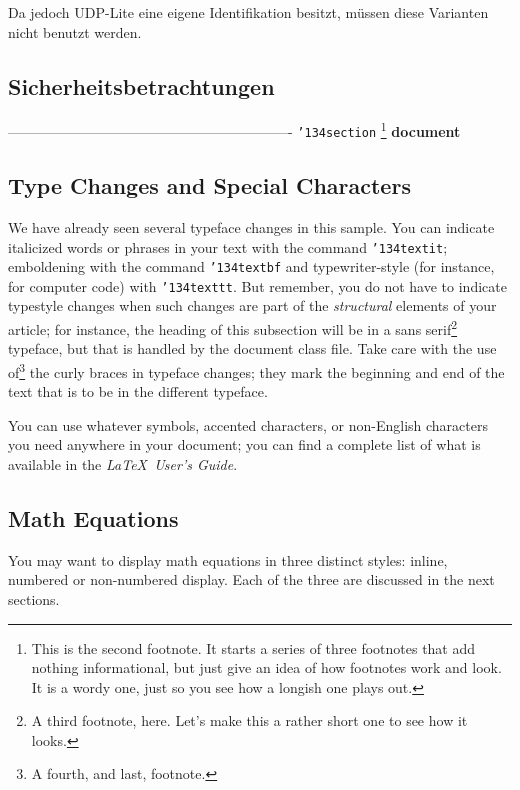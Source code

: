 \documentclass{template}
\begin{document}
Da jedoch UDP-Lite eine eigene Identifikation besitzt,
müssen diese Varianten nicht benutzt werden.


\subsection{Sicherheitsbetrachtungen}









-------------------------------------------------------------
\texttt{{\char'134}section}
\footnote{This is the second footnote.  It
starts a series of three footnotes that add nothing
informational, but just give an idea of how footnotes work
and look. It is a wordy one, just so you see
how a longish one plays out.}
\textbf{document} 


\subsection{Type Changes and {\subsecit Special} Characters}
We have already seen several typeface changes in this sample.  You
can indicate italicized words or phrases in your text with
the command \texttt{{\char'134}textit}; emboldening with the
command \texttt{{\char'134}textbf}
and typewriter-style (for instance, for computer code) with
\texttt{{\char'134}texttt}.  But remember, you do not
have to indicate typestyle changes when such changes are
part of the \textit{structural} elements of your
article; for instance, the heading of this subsection will
be in a sans serif\footnote{A third footnote, here.
Let's make this a rather short one to
see how it looks.} typeface, but that is handled by the
document class file. Take care with the use
of\footnote{A fourth, and last, footnote.}
the curly braces in typeface changes; they mark
the beginning and end of
the text that is to be in the different typeface.

You can use whatever symbols, accented characters, or
non-English characters you need anywhere in your document;
you can find a complete list of what is
available in the \textit{\LaTeX\
User's Guide}\cite{Lamport:LaTeX}.

\subsection{Math Equations}
You may want to display math equations in three distinct styles:
inline, numbered or non-numbered display.  Each of
the three are discussed in the next sections.
\end{document}
